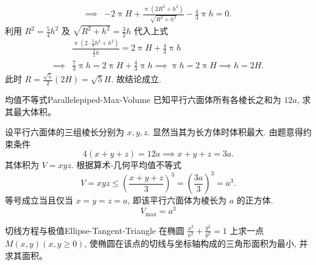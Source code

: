 \begin{myproof}
\begin{equation}
\begin{aligned}
            \implies & -2 \uppi H + \frac{\uppi (2R^2 + h^2)}{\sqrt{R^2 + h^2}} - \frac{4}{3} \uppi h = 0 .
        \end{aligned}
    \end{equation}
    利用 $R^2 = \frac{5}{4}h^2$ 及 $\sqrt{R^2 + h^2} = \frac{3}{2}h$ 代入上式
    \begin{equation}
        \begin{aligned}
                     & \frac{\uppi \left( 2 \cdot \frac{5}{4}h^2 + h^2 \right)}{\frac{3}{2}h} = 2 \uppi H + \frac{4}{3} \uppi h \\
            \implies & \frac{7}{3} \uppi h = 2 \uppi H + \frac{4}{3} \uppi h \implies \uppi h = 2 \uppi H \implies h = 2H .
        \end{aligned}
    \end{equation}
    此时 $R = \frac{\sqrt{5}}{2}(2H) = \sqrt{5}H$. 故结论成立.
\end{myproof}

\begin{problem}{均值不等式}{Parallelepiped-Max-Volume}
    已知平行六面体所有各棱长之和为 $12a$, 求其最大体积。
\end{problem}

\begin{solution}
    设平行六面体的三组棱长分别为 $x, y, z$. 显然当其为长方体时体积最大.
    由题意得约束条件
    \begin{equation}
        4(x + y + z) = 12a \implies x + y + z = 3a .
    \end{equation}
    其体积为 $V = xyz$. 根据算术-几何平均值不等式
    \begin{equation}
        V = xyz \le \left( \frac{x + y + z}{3} \right)^3 = \left( \frac{3a}{3} \right)^3 = a^3 .
    \end{equation}
    等号成立当且仅当 $x = y = z = a$, 即该平行六面体为棱长为 $a$ 的正方体.
    \begin{equation}
        \boxed{V_{\max} = a^3}
    \end{equation}
\end{solution}

\begin{problem}{切线方程与极值}{Ellipse-Tangent-Triangle}
    在椭圆 $\frac{x^2}{a^2} + \frac{y^2}{b^2} = 1$ 上求一点 $M(x, y) (x, y \ge 0)$, 使椭圆在该点的切线与坐标轴构成的三角形面积为最小, 并求其面积。
\end{problem}


